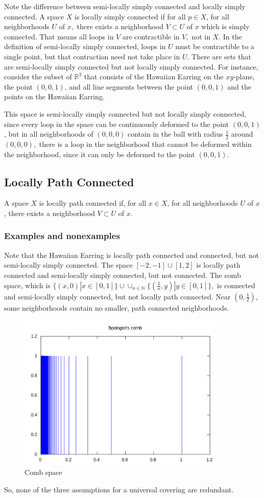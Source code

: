 \documentclass{article}
\begin{document}
Note the difference between semi-locally simply connected and locally simply connected. A space $X$ is locally simply connected if for all $p\in X$, for all neighborhoods $U$ of $x,$ there exists a neighborhood $V\subset U$ of $x$ which is simply connected. That means all loops in $V$ are contractible in $V,$ not in $X$. In the definition of semi-locally simply connected, loops in $U$ must be contractible to a single point, but that contraction need not take place in $U.$ There are sets that are semi-locally simply connected but not locally simply connected. For instance, consider the subset of $\mathbb{R}^3$ that consists of the Hawaiian Earring on the $xy$-plane, the point $(0, 0, 1)$, and all line segments between the point $(0, 0, 1)$ and the points on the Hawaiian Earring. 

This space is semi-locally simply connected but not locally simply connected, since every loop in the space can be continuously deformed to the point $(0, 0, 1)$, but in all neighborhoods of $(0, 0, 0)$ contain in the ball with radius $\frac{1}{2}$ around $(0, 0, 0),$ there is a loop in the neighborhood that cannot be deformed within the neighborhood, since it can only be deformed to the point $(0, 0, 1).$

\subsection{Locally Path Connected}
A space $X$ is locally path connected if, for all $x\in X$, for all neighborhoods $U$ of $x$, there exists a neighborhood $V\subset U$ of $x$.
\subsubsection{Examples and nonexamples}
Note that the Hawaiian Earring is locally path connected and connected, but not semi-locally simply connected. The space $[-2, -1]\cup [1, 2]$ is locally path connected and semi-locally simply connected, but not connected. The comb space, which is $\{(x, 0) |x\in [0, 1]\}\cup \cup_{n\in \mathbb{N}} \{(\frac{1}{n}, y)|y\in [0, 1]\},$ is connected and semi-locally simply connected, but not locally path connected. Near $(0, \frac{1}{2})$, some neighborhoods contain no smaller, path connected neighborhoods.
\begin{figure}[H]
\centering
\includegraphics[width=10cm]{images/m4_comb.png}
\caption{\small{Comb space}}
\label{img:combspace}
\end{figure}
So, none of the three assumptions for a universal covering are redundant.
\end{document}

